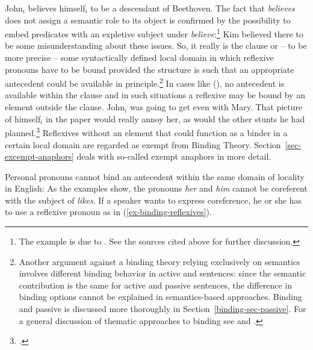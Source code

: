 \documentclass[output=paper,biblatex,babelshorthands,newtxmath,draftmode,colorlinks,citecolor=brown]{langscibook}
\begin{document}
\ea
John$_i$ believes himself$_i$ to be a descendant of Beethoven.
\z
The fact that \emph{believes} does not assign a semantic role to its object is confirmed by the
possibility to embed predicates with an expletive subject under \emph{believe}:\footnote{%
The example is due to \citet[]{ps2}. See the sources cited above for further discussion.
}
\ea
Kim believed there to be some misunderstanding about these issues.
\z
So, it really is the clause or -- to be more precise -- some syntactically defined local domain in
which reflexive pronouns have to be bound provided the structure is such that an
  appropriate antecedent could be available in principle.\footnote{%
Another argument against a binding theory relying exclusively on semantics involves different binding
behavior in active and  sentences: since the semantic contribution is the same for active
and passive sentences, the difference in binding options cannot be explained in semantics-based
approaches. Binding and passive is discussed more thoroughly in Section~\ref{binding-sec-passive}. 
For a general discussion of
thematic approaches to binding see  and .
}
In cases like (), no antecedent is available within the clause and in such situations a
reflexive may be bound by an element outside the clause.
\eanoraggedright
\label{ex-stunts}
John$_i$ was going to get even with Mary. That picture of himself$_i$
in the paper would really annoy her, as would the other stunts he had planned.\footnote{
        .
}
\z
Reflexives without an element that could function as a binder in a certain local domain are regarded
as exempt from Binding Theory. Section~\ref{sec-excempt-anaphors} deals with so-called exempt anaphors in more detail.

Personal pronouns cannot bind an antecedent within the same domain of locality in English:
\eal
{}
\zl
As the examples show, the pronouns \emph{her} and \emph{him} cannot be coreferent with the subject
of \emph{likes}. If a speaker wants to express coreference, he or she has to use a reflexive pronoun
as in (\ref{ex-binding-reflexives}). 
\end{document}
